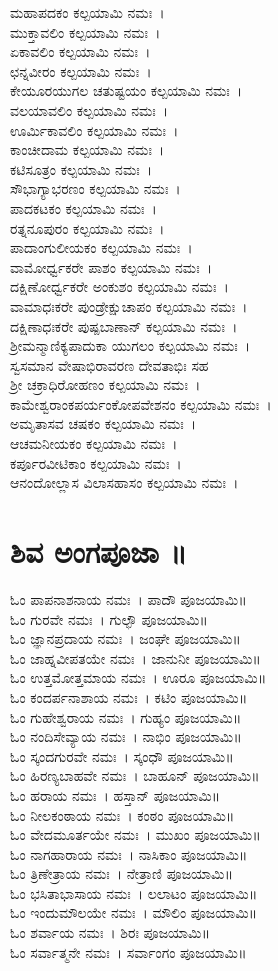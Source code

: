 ಮಹಾಪದಕಂ ಕಲ್ಪಯಾಮಿ ನಮಃ~।\\
ಮುಕ್ತಾವಲಿಂ ಕಲ್ಪಯಾಮಿ ನಮಃ~।\\
ಏಕಾವಲಿಂ ಕಲ್ಪಯಾಮಿ ನಮಃ~।\\
ಛನ್ನವೀರಂ ಕಲ್ಪಯಾಮಿ ನಮಃ~।\\
ಕೇಯೂರಯುಗಲ ಚತುಷ್ಟಯಂ ಕಲ್ಪಯಾಮಿ ನಮಃ~।\\
ವಲಯಾವಲಿಂ ಕಲ್ಪಯಾಮಿ ನಮಃ~।\\
ಊರ್ಮಿಕಾವಲಿಂ ಕಲ್ಪಯಾಮಿ ನಮಃ~।\\
ಕಾಂಚೀದಾಮ ಕಲ್ಪಯಾಮಿ ನಮಃ~।\\
ಕಟಿಸೂತ್ರಂ ಕಲ್ಪಯಾಮಿ ನಮಃ~।\\
ಸೌಭಾಗ್ಯಾಭರಣಂ ಕಲ್ಪಯಾಮಿ ನಮಃ~।\\
ಪಾದಕಟಕಂ ಕಲ್ಪಯಾಮಿ ನಮಃ~।\\
ರತ್ನನೂಪುರಂ ಕಲ್ಪಯಾಮಿ ನಮಃ~।\\
ಪಾದಾಂಗುಲೀಯಕಂ ಕಲ್ಪಯಾಮಿ ನಮಃ~।\\
ವಾಮೋರ್ಧ್ವಕರೇ ಪಾಶಂ ಕಲ್ಪಯಾಮಿ ನಮಃ~।\\
ದಕ್ಷಿಣೋರ್ಧ್ವಕರೇ ಅಂಕುಶಂ ಕಲ್ಪಯಾಮಿ ನಮಃ~।\\
ವಾಮಾಧಃಕರೇ ಪುಂಡ್ರೇಕ್ಷುಚಾಪಂ ಕಲ್ಪಯಾಮಿ ನಮಃ~।\\
ದಕ್ಷಿಣಾಧಃಕರೇ ಪುಷ್ಪಬಾಣಾನ್ ಕಲ್ಪಯಾಮಿ ನಮಃ~।\\
ಶ್ರೀಮನ್ಮಾಣಿಕ್ಯಪಾದುಕಾ ಯುಗಲಂ ಕಲ್ಪಯಾಮಿ ನಮಃ~।\\
ಸ್ವಸಮಾನ ವೇಷಾಭಿರಾವರಣ ದೇವತಾಭಿಃ ಸಹ\\ ಶ್ರೀ ಚಕ್ರಾಧಿರೋಹಣಂ ಕಲ್ಪಯಾಮಿ ನಮಃ~।\\
ಕಾಮೇಶ್ವರಾಂಕಪರ್ಯಂಕೋಪವೇಶನಂ ಕಲ್ಪಯಾಮಿ ನಮಃ~।\\
ಅಮೃತಾಸವ ಚಷಕಂ ಕಲ್ಪಯಾಮಿ ನಮಃ~।\\
ಆಚಮನೀಯಕಂ ಕಲ್ಪಯಾಮಿ ನಮಃ~।\\
ಕರ್ಪೂರವೀಟಿಕಾಂ ಕಲ್ಪಯಾಮಿ ನಮಃ~।\\
ಆನಂದೋಲ್ಲಾಸ ವಿಲಾಸಹಾಸಂ ಕಲ್ಪಯಾಮಿ ನಮಃ~।
\section{ಶಿವ ಅಂಗಪೂಜಾ ॥}
ಓಂ ಪಾಪನಾಶನಾಯ ನಮಃ~। ಪಾದೌ ಪೂಜಯಾಮಿ॥\\
ಓಂ ಗುರವೇ ನಮಃ~। ಗುಲ್ಫೌ ಪೂಜಯಾಮಿ॥\\
ಓಂ ಜ್ಞಾನಪ್ರದಾಯ ನಮಃ~। ಜಂಘೇ ಪೂಜಯಾಮಿ॥\\
ಓಂ ಜಾಹ್ನವೀಪತಯೇ ನಮಃ~। ಜಾನುನೀ ಪೂಜಯಾಮಿ॥\\
ಓಂ ಉತ್ತಮೋತ್ತಮಾಯ ನಮಃ~। ಊರೂ ಪೂಜಯಾಮಿ॥\\
ಓಂ ಕಂದರ್ಪನಾಶಾಯ ನಮಃ~। ಕಟಿಂ ಪೂಜಯಾಮಿ॥\\
ಓಂ ಗುಹೇಶ್ವರಾಯ ನಮಃ~। ಗುಹ್ಯಂ ಪೂಜಯಾಮಿ॥\\
ಓಂ ನಂದಿಸೇವ್ಯಾಯ ನಮಃ~। ನಾಭಿಂ ಪೂಜಯಾಮಿ॥\\
ಓಂ ಸ್ಕಂದಗುರವೇ ನಮಃ~। ಸ್ಕಂಧೌ ಪೂಜಯಾಮಿ॥\\
ಓಂ ಹಿರಣ್ಯಬಾಹವೇ ನಮಃ~। ಬಾಹೂನ್ ಪೂಜಯಾಮಿ॥\\
ಓಂ ಹರಾಯ ನಮಃ~। ಹಸ್ತಾನ್ ಪೂಜಯಾಮಿ॥\\
ಓಂ ನೀಲಕಂಠಾಯ ನಮಃ~। ಕಂಠಂ ಪೂಜಯಾಮಿ॥\\
ಓಂ ವೇದಮೂರ್ತಯೇ ನಮಃ~। ಮುಖಂ ಪೂಜಯಾಮಿ॥\\
ಓಂ ನಾಗಹಾರಾಯ ನಮಃ~। ನಾಸಿಕಾಂ ಪೂಜಯಾಮಿ॥\\
ಓಂ ತ್ರಿಣೇತ್ರಾಯ ನಮಃ~। ನೇತ್ರಾಣಿ ಪೂಜಯಾಮಿ॥\\
ಓಂ ಭಸಿತಾಭಾಸಾಯ ನಮಃ~। ಲಲಾಟಂ ಪೂಜಯಾಮಿ॥\\
ಓಂ ಇಂದುಮೌಲಯೇ ನಮಃ~। ಮೌಲಿಂ ಪೂಜಯಾಮಿ॥\\
ಓಂ ಶರ್ವಾಯ ನಮಃ~। ಶಿರಃ ಪೂಜಯಾಮಿ॥\\
ಓಂ ಸರ್ವಾತ್ಮನೇ ನಮಃ~। ಸರ್ವಾಂಗಂ ಪೂಜಯಾಮಿ॥

